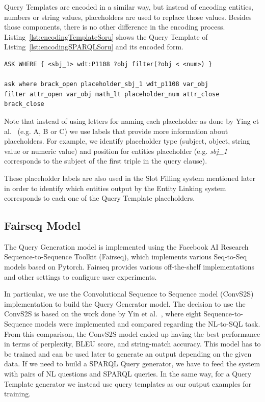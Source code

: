 Query Templates are encoded in a similar way, but instead of encoding entities, numbers or 
string values, placeholders are used to replace those values. Besides those components, there 
is no other difference in the encoding process. Listing~\ref{lst:encodingTemplateSoru} shows 
the Query Template of Listing~\ref{lst:encodingSPARQLSoru} and its encoded form.

\begin{lstlisting}[captionpos=b, 
    caption=SPARQL query example with its encoded form., 
    label=lst:encodingTemplateSoru,
    basicstyle=\ttfamily,frame=single]
ASK WHERE { <sbj_1> wdt:P1108 ?obj filter(?obj < <num>) }

ask where brack_open placeholder_sbj_1 wdt_p1108 var_obj 
filter attr_open var_obj math_lt placeholder_num attr_close brack_close
\end{lstlisting}

Note that instead of using letters for naming each placeholder as done by Ying et al.~\cite{nmt:nl-to-sparql-Yin19} 
(e.g. A, B or C) we use labels that provide more information about placeholders. For example, 
we identify placeholder type (subject, object, string value or numeric value) and position 
for entities placeholder (e.g. \textit{sbj\_1} corresponds to the subject of the first triple in the 
query clause).

These placeholder labels are also used in the Slot Filling system mentioned later in order to 
identify which entities output by the Entity Linking system corresponds to each one of the 
Query Template placeholders. 

\subsection{Fairseq Model}
The Query Generation model is implemented using the Facebook AI Research Sequence-to-Sequence 
Toolkit (Fairseq), which implements various Seq-to-Seq models based on Pytorch. Fairseq 
provides various off-the-shelf implementations and other settings to configure user 
experiments. 


In particular, we use the Convolutional Sequence to Sequence model (ConvS2S)~\cite{nmt:convS2S-GehringAGYD17} 
implementation to build the Query Generator model. The decision to use the ConvS2S is based 
on the work done by Yin et al.~\cite{nmt:nl-to-sparql-Yin19}, where eight Sequence-to-Sequence 
models were implemented and compared regarding the NL-to-SQL task. From this comparison, 
the ConvS2S model ended up having the best performance in terms of perplexity, BLEU score, 
and string-match accuracy. This model has to be trained and can be used later to generate an 
output depending on the given data. If we need to build a SPARQL Query generator, we have to 
feed the system with pairs of NL questions and SPARQL queries. In the same way, for a Query 
Template generator we instead use query templates as our output examples for training.

